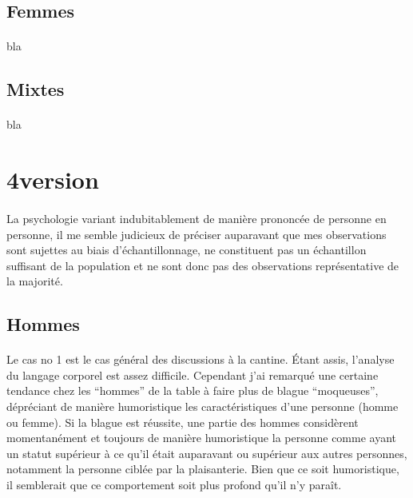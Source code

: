 \subsection{Femmes}

\paragraph{}
bla

\subsection{Mixtes}

\paragraph{}
bla

\section{4\ieme version}

\paragraph{} La psychologie variant indubitablement de manière prononcée de
personne en personne, il me semble judicieux de préciser auparavant que mes
observations sont sujettes au biais d'échantillonnage, ne constituent pas un
échantillon suffisant de la population et ne sont donc pas des observations
représentative de la majorité.

\subsection{Hommes}

\paragraph{} Le cas no 1 est le cas général des discussions à la cantine. Étant
assis, l'analyse du langage corporel est assez difficile. Cependant j'ai
remarqué une certaine tendance chez les “hommes” de la table à faire plus de
blague “moqueuses”, dépréciant de manière humoristique les caractéristiques
d'une personne (homme ou femme). Si la blague est réussite, une partie des
hommes considèrent momentanément et toujours de manière humoristique la
personne comme ayant un statut supérieur à ce qu'il était auparavant ou
supérieur aux autres personnes, notamment la personne ciblée par la
plaisanterie. Bien que ce soit humoristique, il semblerait que ce comportement
soit plus profond qu'il n'y paraît.

